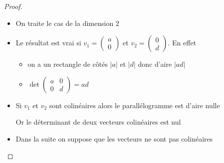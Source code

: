 \begin{frame}

\begin{proof}

\begin{itemize}
  \item On traite le cas de la dimension $2$
  \item\pause Le résultat est vrai si 
$v_1=\left(\begin{smallmatrix}a\\0\end{smallmatrix}\right)$ et 
$v_2=\left(\begin{smallmatrix}0\\d\end{smallmatrix}\right)$\pause.  En effet
\begin{itemize}
  \item on a un rectangle de côtés $|a|$ et $|d|$ donc d'aire $|ad|$
  \item\pause $\det \begin{pmatrix}
	a&0\\0&d
\end{pmatrix} =ad$
\end{itemize}
\vspace{-.6cm} 


  \item \pause Si $v_1$ et $v_2$ sont colinéaires alors
le parallélogramme est d'aire nulle

 \pause
Or le déterminant de deux vecteurs colinéaires est nul

  \item \pause Dans la suite on suppose que les vecteurs ne sont pas colinéaires
  
\end{itemize}
\noqed\vspace*{-4ex}
\end{proof}
\end{frame}


